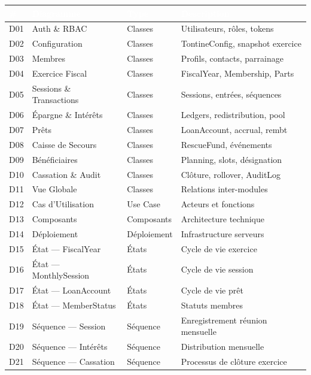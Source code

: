 \documentclass[12pt, a4paper]{report}
\begin{document}
\begin{center}
\begin{tabular}{C{0.8cm}L{3.5cm}L{2.5cm}L{6cm}}
  \toprule
  \textcolor{white}{\textbf{\#}} &
  \textcolor{white}{\textbf{Diagramme}} &
  \textcolor{white}{\textbf{Type}} &
  \textcolor{white}{\textbf{Description}} \\
  \midrule
  D01 & Auth \& RBAC             & Classes    & Utilisateurs, rôles, tokens \\
  D02 & Configuration            & Classes    & TontineConfig, snapshot exercice \\
  D03 & Membres                  & Classes    & Profils, contacts, parrainage \\
  D04 & Exercice Fiscal          & Classes    & FiscalYear, Membership, Parts \\
  D05 & Sessions \& Transactions & Classes    & Sessions, entrées, séquences \\
  D06 & Épargne \& Intérêts      & Classes    & Ledgers, redistribution, pool \\
  D07 & Prêts                    & Classes    & LoanAccount, accrual, rembt \\
  D08 & Caisse de Secours        & Classes    & RescueFund, événements \\
  D09 & Bénéficiaires            & Classes    & Planning, slots, désignation \\
  D10 & Cassation \& Audit       & Classes    & Clôture, rollover, AuditLog \\
  D11 & Vue Globale              & Classes    & Relations inter-modules \\
  D12 & Cas d'Utilisation        & Use Case   & Acteurs et fonctions \\
  D13 & Composants               & Composants & Architecture technique \\
  D14 & Déploiement              & Déploiement& Infrastructure serveurs \\
  D15 & État — FiscalYear        & États      & Cycle de vie exercice \\
  D16 & État — MonthlySession    & États      & Cycle de vie session \\
  D17 & État — LoanAccount       & États      & Cycle de vie prêt \\
  D18 & État — MemberStatus      & États      & Statuts membres \\
  D19 & Séquence — Session       & Séquence   & Enregistrement réunion mensuelle \\
  D20 & Séquence — Intérêts      & Séquence   & Distribution mensuelle \\
  D21 & Séquence — Cassation     & Séquence   & Processus de clôture exercice \\
  \bottomrule
\end{tabular}
\end{center}
\end{document}
